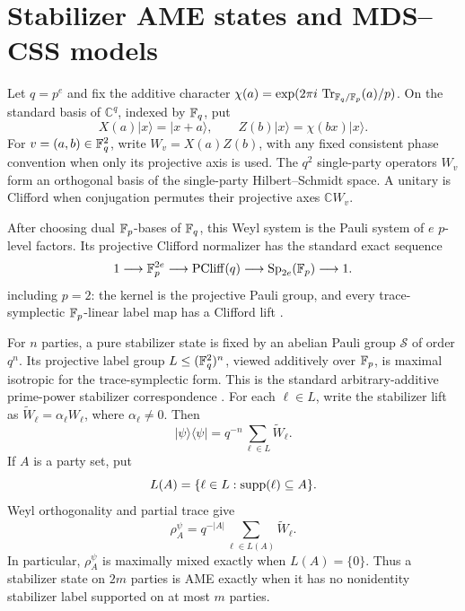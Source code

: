 \section{Stabilizer AME states and MDS--CSS models}\label{sec:dictionary}

Let \(q=p^e\) and fix the additive character
\(\chi(a)=\exp(2\pi i\,\operatorname{Tr}_{\mathbb F_q/\mathbb F_p}(a)/p)\).  On the standard basis of
\(\mathbb C^q\), indexed by \(\mathbb F_q\), put
\[
 X(a)\lvert x\rangle=\lvert x+a\rangle,\qquad
 Z(b)\lvert x\rangle=\chi(bx)\lvert x\rangle .
\]
For \(v=(a,b)\in\mathbb F_q^2\), write \(W_v=X(a)Z(b)\), with any fixed
consistent phase convention when only its projective axis is used.  The
\(q^2\) single-party operators \(W_v\) form an
orthogonal basis of the single-party Hilbert--Schmidt space.  A unitary is
Clifford when conjugation permutes their projective axes
\(\mathbb C W_v\).

After choosing dual \(\mathbb F_p\)-bases of \(\mathbb F_q\), this Weyl system is the
Pauli system of \(e\) \(p\)-level factors.  Its projective Clifford
normalizer has the standard exact sequence
\begin{equation}\label{eq:projective-clifford-sequence}
 1\longrightarrow \mathbb F_p^{2e}\longrightarrow
 \operatorname{PCliff}(q)\longrightarrow
 \operatorname{Sp}_{2e}(\mathbb F_p)\longrightarrow1.
\end{equation}
including \(p=2\): the kernel is the projective Pauli group, and every
trace-symplectic \(\mathbb F_p\)-linear label map has a Clifford lift
\cite{DehaeneDeMoor2003,HostensDehaeneDeMoor2005}.

For \(n\) parties, a pure stabilizer state is fixed by an abelian Pauli
group \(\mathcal S\) of order \(q^n\).  Its projective label group
\(L\leq(\mathbb F_q^2)^n\), viewed additively over \(\mathbb F_p\), is maximal isotropic
for the trace-symplectic form.  This is the standard arbitrary-additive
prime-power stabilizer correspondence
\cite[Theorems~13 and 15]{KetkarKlappeneckerKumarSarvepalli2006}.
For each \(\ell\in L\), write the stabilizer lift as
\(\widetilde W_\ell=\alpha_\ell W_\ell\), where
\(\alpha_\ell\ne0\).  Then
\begin{equation}\label{eq:stabilizer-projector}
 \lvert\psi\rangle\langle\psi\rvert
   =q^{-n}\sum_{\ell\in L}\widetilde W_\ell .
\end{equation}
If \(A\) is a party set, put
\[
 L(A)=\{\ell\in L:\operatorname{supp}(\ell)\subseteq A\}.
\]
Weyl orthogonality and partial trace give
\begin{equation}\label{eq:reduced-stabilizer-state}
 \rho^\psi_A=q^{-|A|}\sum_{\ell\in L(A)}\widetilde W_\ell .
\end{equation}
In particular, \(\rho^\psi_A\) is maximally mixed exactly when
\(L(A)=\{0\}\).  Thus a stabilizer state on \(2m\) parties is AME exactly
when it has no nonidentity stabilizer label supported on at most \(m\)
parties.

